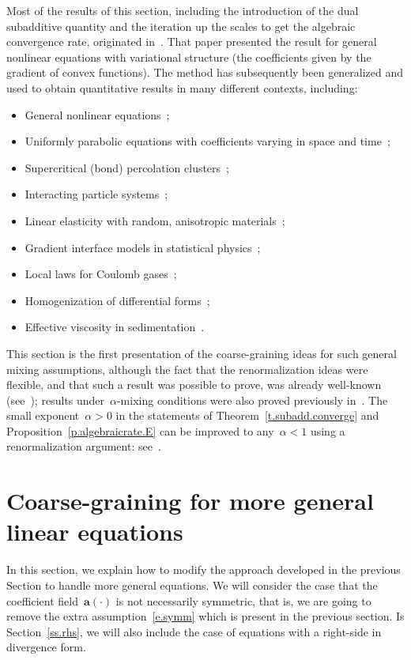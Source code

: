 \documentclass[11pt]{article} %
\numberwithin{equation}{section}
\theoremstyle{definition}
\renewcommand{\a}{\mathbf{a}}
\begin{document}
Most of the results of this section, including the introduction of the dual subadditive quantity and the iteration up the scales to get the algebraic convergence rate, originated in~\cite{AS}. That paper presented the result for general nonlinear equations with variational structure (the coefficients given by the gradient of convex functions). The method has subsequently been generalized and used to obtain quantitative results in many different contexts, including: 
\begin{itemize}
\item General nonlinear equations~\cite{AM};

\item Uniformly parabolic equations with coefficients varying in space and time~\cite{ABM};

\item Supercritical (bond) percolation clusters~\cite{AD1}; 

\item Interacting particle systems~\cite{GGM};

\item Linear elasticity with random, anisotropic materials~\cite{SZ1};

\item Gradient interface models in statistical physics~\cite{D1,AW,DW,AD2};

\item Local laws for Coulomb gases~\cite{ArmSer};

\item Homogenization of differential forms~\cite{D3};

\item Effective viscosity in sedimentation~\cite{DG0}.

\end{itemize}

This section is the first presentation of the coarse-graining ideas for such general mixing assumptions, although the fact that the renormalization ideas were flexible, and that such a result was possible to prove, was already well-known (see~\cite[page xxiv]{AKMBook}); results under~$\alpha$-mixing conditions were also proved previously in~\cite{AM}.
The small exponent~$\alpha>0$ in the statements of Theorem~\ref{t.subadd.converge} and Proposition~\ref{p.algebraicrate.E} can be improved to any~$\alpha<1$ using a renormalization argument: see~\cite{AKM1}.



\section{Coarse-graining for more general linear equations}
\label{s.nonsymm}
In this section, we explain how to modify the approach developed in the previous Section to handle more general equations. We will consider the case that the coefficient field~$\a(\cdot)$ is not necessarily symmetric, that is, we are going to remove the extra assumption~\eqref{e.symm} which is present in the previous section. Is Section~\ref{ss.rhs}, we will also include the case of equations with a right-side in divergence form. 
\end{document}
